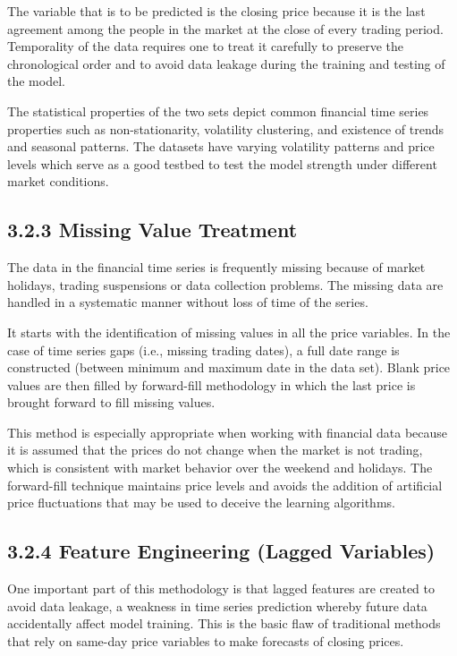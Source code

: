 \documentclass[12pt,a4paper]{report}
\begin{document}
The variable that is to be predicted is the closing price because it is the last agreement among the people in the market at the close of every trading period. Temporality of the data requires one to treat it carefully to preserve the chronological order and to avoid data leakage during the training and testing of the model.

The statistical properties of the two sets depict common financial time series properties such as non-stationarity, volatility clustering, and existence of trends and seasonal patterns. The datasets have varying volatility patterns and price levels which serve as a good testbed to test the model strength under different market conditions.

\subsection{3.2.3 Missing Value Treatment}
The data in the financial time series is frequently missing because of market holidays, trading suspensions or data collection problems. The missing data are handled in a systematic manner without loss of time of the series.

It starts with the identification of missing values in all the price variables. In the case of time series gaps (i.e., missing trading dates), a full date range is constructed (between minimum and maximum date in the data set). Blank price values are then filled by forward-fill methodology in which the last price is brought forward to fill missing values.

This method is especially appropriate when working with financial data because it is assumed that the prices do not change when the market is not trading, which is consistent with market behavior over the weekend and holidays. The forward-fill technique maintains price levels and avoids the addition of artificial price fluctuations that may be used to deceive the learning algorithms.

\subsection{3.2.4 Feature Engineering (Lagged Variables)}
One important part of this methodology is that lagged features are created to avoid data leakage, a weakness in time series prediction whereby future data accidentally affect model training. This is the basic flaw of traditional methods that rely on same-day price variables to make forecasts of closing prices.
\end{document}
